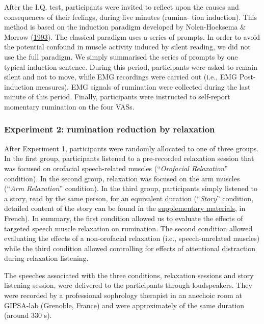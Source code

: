 \documentclass[a4paper,12pt,twoside,openright,oldfontcommands]{memoir}
\begin{document}
After the I.Q. test, participants were invited to reflect upon the
causes and consequences of their feelings, during five minutes (rumina-
tion induction). This method is based on the induction paradigm
developed by Nolen-Hoeksema \& Morrow
(\protect\hyperlink{ref-nolen-hoeksema_effects_1993}{1993}). The
classical paradigm uses a series of prompts. In order to avoid the
potential confound in muscle activity induced by silent reading, we did
not use the full paradigm. We simply summarised the series of prompts by
one typical induction sentence. During this period, participants were
asked to remain silent and not to move, while EMG recordings were
carried out (i.e., EMG Post-induction measures). EMG signals of
rumination were collected during the last minute of this period.
Finally, participants were instructed to self-report momentary
rumination on the four VASs.

\subsubsection{Experiment 2: rumination reduction by
relaxation}\label{experiment-2-rumination-reduction-by-relaxation}

After Experiment 1, participants were randomly allocated to one of three
groups. In the first group, participants listened to a pre-recorded
relaxation session that was focused on orofacial speech-related muscles
(``\emph{Orofacial Relaxation}'' condition). In the second group,
relaxation was focused on the arm muscles (``\emph{Arm Relaxation}''
condition). In the third group, participants simply listened to a story,
read by the same person, for an equivalent duration (``\emph{Story}''
condition, detailed content of the story can be found in the
\protect\hyperlink{suppCH3}{supplementary materials}, in French). In
summary, the first condition allowed us to evaluate the effects of
targeted speech muscle relaxation on rumination. The second condition
allowed evaluating the effects of a non-orofacial relaxation (i.e.,
speech-unrelated muscles) while the third condition allowed controlling
for effects of attentional distraction during relaxation listening.

The speeches associated with the three conditions, relaxation sessions
and story listening session, were delivered to the participants through
loudspeakers. They were recorded by a professional sophrology therapist
in an anechoic room at GIPSA-lab (Grenoble, France) and were
approximately of the same duration (around 330 s).
\end{document}
